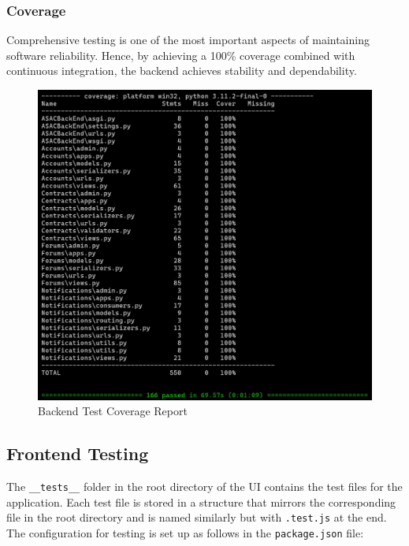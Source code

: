 \subsubsection{Coverage}

Comprehensive testing is one of the most important aspects of maintaining software reliability. Hence, by achieving a 100\% coverage combined with continuous integration, the backend achieves stability and dependability.

\begin{figure}[!ht]
    \centering
    \includegraphics[width=1\textwidth]
    {LATEX/Appendices/Images/Software/Backend/backend_testing_report.png}
    \caption{Backend Test Coverage Report}
    \label{fig:backend_testing}
\end{figure}

\subsection{Frontend Testing}

The \texttt{\_\_tests\_\_} folder in the root directory of the UI contains the test files for the application. Each test file is stored in a structure that mirrors the corresponding file in the root directory and is named similarly but with \texttt{.test.js} at the end. The configuration for testing is set up as follows in the \texttt{package.json} file:

